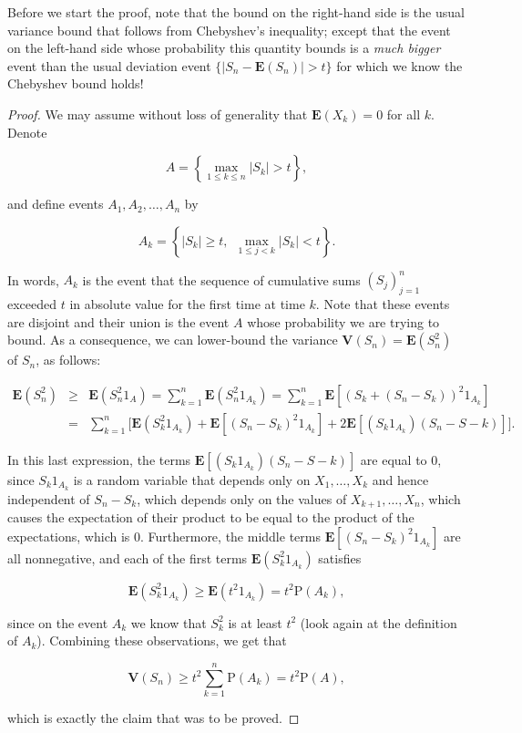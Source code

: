 \documentclass[11pt]{report}
\theoremstyle{plain}
\theoremstyle{definition}
\begin{document}
Before we start the proof, note that the bound on the
right-hand side is the usual variance bound that
follows from Chebyshev's inequality; except that the
event on the left-hand side whose probability this
quantity bounds is a \emph{much bigger} event than the
usual deviation event $\{ |S_n-\mathbf{E}(S_n)|>t\}$
for which we know the Chebyshev bound holds!

\begin{proof}
We may assume without loss of generality that
$\mathbf{E}(X_k)=0$ for all $k$. Denote

\[
A = \left\{ \max_{1\le k\le n} |S_k| > t\right\},
\]

and define events $A_1,A_2,\ldots,A_n$ by

\[
A_k = \left\{ |S_k|\ge t, \ \ \max_{1\le j<k} |S_k|<t \right\}.
\]

In words, $A_k$ is the event that the sequence of
cumulative sums $(S_j)_{j=1}^n$ exceeded $t$ in
absolute value for the first time at time $k$. Note
that these events are disjoint and their union is the
event $A$ whose probability we are trying to bound.
As a consequence, we can lower-bound the variance
$\mathbf{V}(S_n)=\mathbf{E}(S_n^2)$ of $S_n$, as
follows:

\begin{eqnarray*}
\mathbf{E}(S_n^2) &\ge& \mathbf{E}(S_n^2 1_A) = \sum_{k=1}^n \mathbf{E} \left(S_n^2 1_{A_k}\right)
= \sum_{k=1}^n \mathbf{E} \left[ \left(S_k+(S_n-S_k)\right)^2 1_{A_k} \right] \\
&=&
\sum_{k=1}^n \Big[\mathbf{E} (S_k^2 1_{A_k}) + \mathbf{E}\left[ (S_n-S_k)^2 1_{A_k} \right]
+ 2 \mathbf{E} \left[(S_k 1_{A_k}) (S_n-S-k) \right] \Big].
\end{eqnarray*}

In this last expression, the terms
$\mathbf{E} \left[(S_k 1_{A_k}) (S_n-S-k) \right]$
are equal to $0$, since $S_k 1_{A_k}$ is a random
variable that depends only on $X_1,\ldots,X_k$ and
hence independent of $S_n-S_k$, which depends only on
the values of $X_{k+1},\ldots,X_n$, which causes the
expectation of their product to be equal to the
product of the expectations, which is 0. Furthermore,
the middle terms
$\mathbf{E}\left[ (S_n-S_k)^2 1_{A_k} \right]$ are
all nonnegative, and each of the first terms
$\mathbf{E} (S_k^2 1_{A_k})$ satisfies

\[
\mathbf{E} (S_k^2 1_{A_k}) \ge \mathbf{E} (t^2 1_{A_k}) = t^2 \mathrm{P}(A_k),
\]

since on the event $A_k$ we know that $S_k^2$ is at
least $t^2$ (look again at the definition of $A_k$).
Combining these observations, we get that

\[
\mathbf{V}(S_n)  \ge t^2\sum_{k=1}^n \mathrm{P}(A_k) = t^2 \mathrm{P}(A),
\]

which is exactly the claim that was to be proved.
\end{proof}
\end{document}
